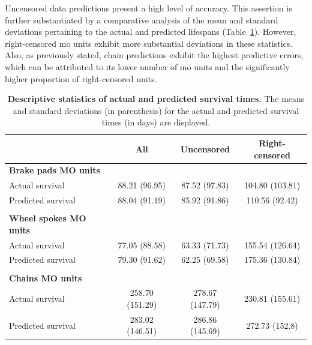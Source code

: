    Uncensored data predictions present a high level of accuracy. This assertion is further substantiated by a comparative analysis of the mean and standard deviations pertaining to the actual and predicted lifespans (Table~\ref{tab:actual_vs_pred_descriptive}). However, right-censored \ac{mo} units exhibit more substantial deviations in these statistics. Also, as previously stated, chain predictions exhibit the highest predictive errors, which can be attributed to its lower number of \ac{mo} units and the significantly higher proportion of right-censored units.

    \begin{table}[htbp!]
        \centering
        \footnotesize
        \caption[Descriptive statistics of actual and predicted survival times]{
            \textbf{Descriptive statistics of actual and predicted survival times.} 
            The means and standard deviations (in parenthesis) for the actual and predicted survival times (in days) are displayed.
        }
        \label{tab:actual_vs_pred_descriptive}
        \begin{tabular}{@{}lccc@{}}
            \toprule
                                & {All}           & {Uncensored}    & {Right-censored} \\
            \midrule
            \textbf{Brake pads MO units}                                              \\
            Actual survival    & 88.21 (96.95)   & 87.52 (97.83)   & 104.80 (103.81)  \\
            Predicted survival & 88.04 (91.19)   & 85.92 (91.86)   & 110.56 (92.42)   \\  \\
        
            \textbf{Wheel spokes MO units}                                            \\
            Actual survival    & 77.05 (88.58)   & 63.33 (71.73)   & 155.54 (126.64)  \\
            Predicted survival & 79.30 (91.62)   & 62.25 (69.58)   & 175.36 (130.84)  \\  \\
        
            \textbf{Chains MO units}                                                  \\
            Actual survival    & 258.70 (151.29) & 278.67 (147.79) & 230.81 (155.61)  \\
            Predicted survival & 283.02 (146.51) & 286.86 (145.69) & 272.73 (152.8)   \\
            \bottomrule
        \end{tabular}
        \end{table}

